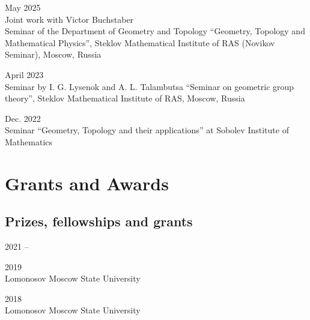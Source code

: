 \documentclass[11pt,letterpaper]{report}
\begin{document}
      \begin{tablist}
      
      \item{May 2025} \\ Joint work with Victor Buchstaber\\ Seminar of the Department of Geometry and Topology ``Geometry, Topology and Mathematical Physics'', Steklov Mathematical Institute of RAS (Novikov Seminar), Moscow, Russia
      
       \item{April 2023} \\ Seminar by I. G. Lysenok and A. L. Talambutsa ``Seminar on geometric group theory'', Steklov Mathematical Institute of RAS, Moscow, Russia
       
       \item{Dec. 2022} \\ Seminar ``Geometry, Topology and their applications'' at Sobolev Institute of Mathematics
       
      
    \end{tablist}

    
    
    
    
     \section*{Grants and Awards}

    \subsection*{Prizes, fellowships and grants}

    \begin{tablist}

        \item[2021 --]  
        \item[2019] \\ Lomonosov Moscow State University
        \item[2018] \\ Lomonosov Moscow State University

    \end{tablist}
\end{document}

